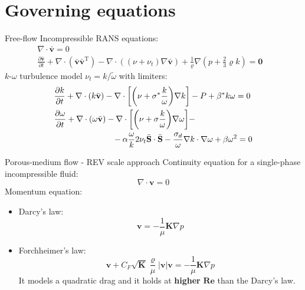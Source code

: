 \documentclass{beamer}
\begin{document}
\section{Governing equations}
\begin{frame}{Free-flow}
Incompressible RANS equations:
\begin{align*}
\nabla \cdot \bar{\mathbf{v}} = 0&\\
\frac{\partial \bar{\mathbf{v}}}{\partial t} + \nabla 
\cdot (\bar{\mathbf{v}} \bar{\mathbf{v}}^\mathrm{T}) - \nabla \cdot 
((\nu + \nu_t) \nabla \bar{\mathbf{v}}) + \frac{1}{\varrho}\nabla (p + \frac{2}{3}\varrho k) = \mathbf{0}&
\end{align*}
$k\text{-}\omega$ turbulence model $\nu_t = k / \tilde{\omega}$ with limiters:
\begin{align*}
&\frac{\partial k}{\partial t} + \nabla \cdot (k\bar{\mathbf{v}}) - \nabla \cdot
\bigg[\bigg(\nu + \sigma^*\frac{k}{\omega}\bigg) \nabla k\bigg] -P + \beta^* k 
\omega = 0\\
&\frac{\partial \omega}{\partial t} + \nabla \cdot (\omega \bar{\mathbf{v}}) - 
\nabla \cdot \bigg[ \bigg( \nu + \sigma \frac{k}{\omega} \bigg) \nabla \omega 
\bigg]-\\
&\hspace{2.5cm}- \alpha \frac{\omega}{k} 2 \nu_t \bar{\mathbf{S}} \cdot \bar{\mathbf{S}} 
-\frac{\sigma_d}{\omega} \nabla k \cdot 
\nabla \omega+ \beta \omega^2 = 0
\end{align*}
\end{frame}
\begin{frame}{Porous-medium flow - REV scale approach}
Continuity equation for a single-phase incompressible fluid:
\begin{equation*}
\nabla \cdot \mathbf{v} = 0
\end{equation*}
Momentum equation:
\begin{itemize}
	\item Darcy's law:
\begin{equation*}
	\mathbf{v} = -\frac{1}{\mu}\mathbf{K} \nabla p
\end{equation*}
	\item Forchheimer's law:
	\begin{equation*}
	\mathbf{v} + C_F \sqrt{\mathbf{K}} \frac{\varrho}{\mu} |\mathbf{v}| 
	\mathbf{v} = - \frac{1}{\mu}\mathbf{K} \nabla p
	\end{equation*}
	It models a quadratic drag and it holds at \textbf{higher} 
	$\boldsymbol{Re}$ than the Darcy's law.
\end{itemize}
\end{frame}
\end{document}
